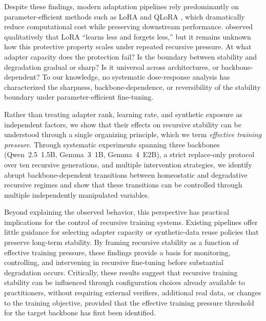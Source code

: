 \documentclass[a4paper,fleqn]{cas-dc}
\begin{document}
Despite these findings, modern adaptation pipelines rely predominantly on
parameter-efficient methods such as LoRA \citep{hu2022} and QLoRA
\citep{dettmers2023}, which dramatically reduce computational cost while
preserving downstream performance. \citet{biderman2024} observed qualitatively
that LoRA ``learns less and forgets less,'' but it remains unknown how this
protective property scales under repeated recursive pressure. At what adapter
capacity does the protection fail? Is the boundary between stability and
degradation gradual or sharp? Is it universal across architectures, or
backbone-dependent? To our knowledge, no systematic dose-response analysis has
characterized the sharpness, backbone-dependence, or reversibility of the
stability boundary under parameter-efficient fine-tuning.

Rather than treating adapter rank, learning rate, and synthetic exposure as
independent factors, we show that their effects on recursive stability can be
understood through a single organizing principle, which we term
\textit{effective training pressure}. Through systematic experiments spanning
three backbones (Qwen~2.5~1.5B, Gemma~3~1B, Gemma~4~E2B), a strict replace-only
protocol over ten recursive generations, and multiple intervention strategies, we
identify abrupt backbone-dependent transitions between homeostatic and degradative
recursive regimes and show that these transitions can be controlled through
multiple independently manipulated variables.

Beyond explaining the observed behavior, this perspective has practical
implications for the control of recursive training systems. Existing
pipelines offer little guidance for selecting adapter capacity or synthetic-data
reuse policies that preserve long-term stability. By framing recursive stability
as a function of effective training pressure, these findings provide a
basis for monitoring, controlling, and intervening in recursive fine-tuning
before substantial degradation occurs. Critically, these results suggest that
recursive training stability can be influenced through configuration choices
already available to practitioners, without requiring external verifiers,
additional real data, or changes to the training objective, provided that the
effective training pressure threshold for the target backbone has first been
identified.
\end{document}
